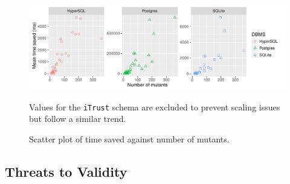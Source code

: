 \begin{figure}[t]
  \centering
  \includegraphics[width=6in]{graphics/time_saved_vs_mutants_scatter_noitrust_facetdbms.pdf}
  \caption{Scatter plot of time saved against number of mutants.}
  {\small Values for the \texttt{iTrust} schema are excluded to prevent scaling issues but follow a similar trend.}
\end{figure}


\subsection{Threats to Validity}
